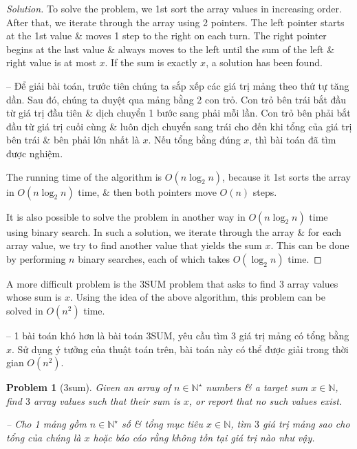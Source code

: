 \documentclass{article}
\newtheorem{problem}{Problem}
\begin{document}
\begin{proof}[Solution]
    To solve the problem, we 1st sort the array values in increasing order. After that, we iterate through the array using 2 pointers. The left pointer starts at the 1st value \& moves 1 step to the right on each turn. The right pointer begins at the last value \& always moves to the left until the sum of the left \& right value is at most $x$. If the sum is exactly $x$, a solution has been found.

    -- Để giải bài toán, trước tiên chúng ta sắp xếp các giá trị mảng theo thứ tự tăng dần. Sau đó, chúng ta duyệt qua mảng bằng 2 con trỏ. Con trỏ bên trái bắt đầu từ giá trị đầu tiên \& dịch chuyển 1 bước sang phải mỗi lần. Con trỏ bên phải bắt đầu từ giá trị cuối cùng \& luôn dịch chuyển sang trái cho đến khi tổng của giá trị bên trái \& bên phải lớn nhất là $x$. Nếu tổng bằng đúng $x$, thì bài toán đã tìm được nghiệm.

    The running time of the algorithm is $O(n\log_2n)$, because it 1st sorts the array in $O(n\log_2n)$ time, \& then both pointers move $O(n)$ steps.

    It is also possible to solve the problem in another way in $O(n\log_2n)$ time using binary search. In such a solution, we iterate through the array \& for each array value, we try to find another value that yields the sum $x$. This can be done by performing $n$ binary searches, each of which takes $O(\log_2n)$ time.
\end{proof}

A more difficult problem is the 3SUM problem that asks to find 3 array values whose sum is $x$. Using the idea of the above algorithm, this problem can be solved in $O(n^2)$ time.

-- 1 bài toán khó hơn là bài toán 3SUM, yêu cầu tìm 3 giá trị mảng có tổng bằng $x$. Sử dụng ý tưởng của thuật toán trên, bài toán này có thể được giải trong thời gian $O(n^2)$.

\begin{problem}[{\sc3sum}]
    Given an array of $n\in\mathbb{N}^\star$ numbers \& a target sum $x\in\mathbb{N}$, find $3$ array values such that their sum is $x$, or report that no such values exist.

    -- Cho 1 mảng gồm $n\in\mathbb{N}^\star$ số \& tổng mục tiêu $x\in\mathbb{N}$, tìm $3$ giá trị mảng sao cho tổng của chúng là $x$ hoặc báo cáo rằng không tồn tại giá trị nào như vậy.
\end{problem}
\end{document}
